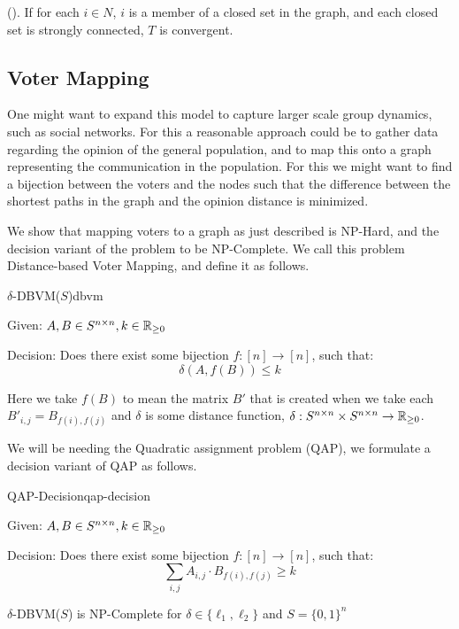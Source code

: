 \begin{proposition}{(\citet{golubNaiveLearningSocial2010}).} If for each \(i
	\in N\), \(i\) is a member of a closed set in the graph, and each closed set is
	strongly connected, \(T\) is convergent. \end{proposition}




\subsection{Voter Mapping} One might want to expand this model to capture
larger scale group dynamics, such as social networks. For this a reasonable
approach could be to gather data regarding the opinion of the general
population, and to map this onto a graph representing the communication in the
population.
For this we might want to find a bijection between the voters and the nodes such that
the difference between the shortest paths in the graph and the opinion distance is minimized.

We show that mapping voters to a graph as just described is NP-Hard, and the decision variant of the problem to be NP-Complete. We call this problem Distance-based Voter Mapping, and define it as follows.


\begin{problem}{$\delta$-DBVM($S$)}{dbvm}
{Given: $A, B \in S^{n \times n}, k\in\mathbb{R}_{\geq 0}$

Decision: Does there exist some bijection $f: [n] \to [n]$, such that: $$\delta(A, f(B)) \leq k$$}

Here we take $f(B)$ to mean the matrix $B'$ that is created when we take each $B'_{i,j} = B_{f(i),f(j)}$ and  $\delta$ is some distance function, $\delta: {S^{n \times n} \times S^{n \times n} \to \mathbb{R}_{\geq 0}}$.
\end{problem}

We will be needing the Quadratic assignment problem (QAP), we formulate a decision variant of QAP as follows.

\begin{problem}{QAP-Decision}{qap-decision}
{Given: $A, B \in S^{n \times n}, k\in\mathbb{R}_{\geq 0}$

Decision: Does there exist some bijection $f: [n] \to [n]$, such that: $$\sum_{i,j} A_{i,j}\cdot B_{f(i),f(j)} \geq k$$}
\end{problem}

\begin{theorem}
	$\delta$-DBVM($S$) is NP-Complete for $\delta\in\{\ell_1, \ell_2\}$ and $S = \{0,1\}^n$
	\label{thm:np_hard_voter_mapping_l2}
\end{theorem}


